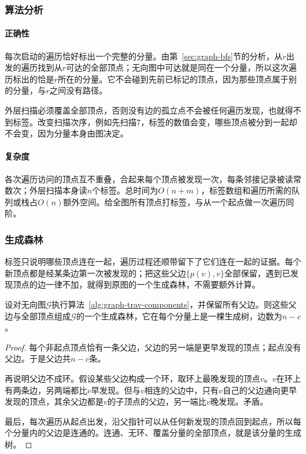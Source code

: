 \subsubsection{算法分析}

\paragraph{正确性}
每次启动的遍历恰好标出一个完整的分量。由第~\ref{sec:graph-bfs}节的分析，从$r$出发的遍历找到从$r$可达的全部顶点；无向图中可达就是同在一个分量，所以这次遍历标出的恰是$r$所在的分量。它不会碰到先前已标记的顶点，因为那些顶点属于别的分量，与$r$之间没有路径。

外层扫描必须覆盖全部顶点，否则没有边的孤立点不会被任何遍历发现，也就得不到标签。改变扫描次序，例如先扫描$7$，标签的数值会变，哪些顶点被分到一起却不会变，因为分量本身由图决定。

\paragraph{复杂度}
各次遍历访问的顶点互不重叠，合起来每个顶点被发现一次，每条邻接记录被读常数次；外层扫描本身读$n$个标签。总时间为$O(n+m)$，标签数组和遍历所需的队列或栈占$O(n)$额外空间。给全图所有顶点打标签，与从一个起点做一次遍历同阶。

\subsubsection{生成森林}
\label{sec:graph-trav-spanning-forest}

标签只说明哪些顶点连在一起，遍历过程还顺带留下了它们连在一起的证据。每个新顶点都是经某条边第一次被发现的；把这些父边$\{p(v),v\}$全部保留，遇到已发现顶点的边一律不加，就得到原图的一个生成森林，不需要额外计算。

\begin{theorem}[发现父边构成生成森林]
\label{thm:graph-trav-parent-forest}
设对无向图$\mathcal G$执行算法~\ref{alg:graph-trav-components}，并保留所有父边。则这些父边与全部顶点组成$\mathcal G$的一个生成森林，它在每个分量上是一棵生成树，边数为$n-c$。
\end{theorem}

\begin{proof}
每个非起点顶点恰有一条父边，父边的另一端是更早发现的顶点；起点没有父边。于是父边共$n-c$条。

再说明父边不成环。假设某些父边构成一个环，取环上最晚发现的顶点$v$。$v$在环上有两条边，另两端都比$v$早发现。但与$v$相连的父边中，只有$v$自己的父边通向更早发现的顶点，其余父边都是$v$的子顶点的父边，另一端比$v$晚发现。矛盾。

最后，每次遍历从起点出发，沿父指针可以从任何新发现的顶点回到起点，所以每个分量内的父边是连通的。连通、无环、覆盖分量的全部顶点，就是该分量的生成树。
\end{proof}

